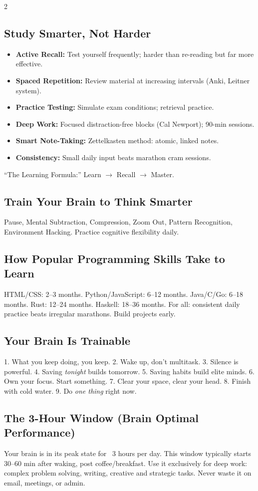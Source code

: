 \documentclass[10pt,a4paper]{article}
\begin{document}
\begin{multicols}{2}
\subsection{Study Smarter, Not Harder}
\begin{itemize}
\item \textbf{Active Recall:} Test yourself frequently; harder than re-reading but far more effective.
\item \textbf{Spaced Repetition:} Review material at increasing intervals (Anki, Leitner system).
\item \textbf{Practice Testing:} Simulate exam conditions; retrieval practice.
\item \textbf{Deep Work:} Focused distraction-free blocks (Cal Newport); 90-min sessions.
\item \textbf{Smart Note-Taking:} Zettelkasten method: atomic, linked notes.
\item \textbf{Consistency:} Small daily input beats marathon cram sessions.
\end{itemize}
``The Learning Formula:'' Learn $\to$ Recall $\to$ Master.

\subsection{Train Your Brain to Think Smarter}
Pause, Mental Subtraction, Compression, Zoom Out, Pattern Recognition, Environment Hacking. Practice cognitive flexibility daily.

\subsection{How Popular Programming Skills Take to Learn}
HTML/CSS: 2--3 months. Python/JavaScript: 6--12 months. Java/C/Go: 6--18 months. Rust: 12--24 months. Haskell: 18--36 months. For all: consistent daily practice beats irregular marathons. Build projects early.

\subsection{Your Brain Is Trainable}
1. What you keep doing, you keep.
2. Wake up, don't multitask.
3. Silence is powerful.
4. Saving \emph{tonight} builds tomorrow.
5. Saving habits build elite minds.
6. Own your focus. Start something.
7. Clear your space, clear your head.
8. Finish with cold water.
9. Do \emph{one thing} right now.

\subsection{The 3-Hour Window (Brain Optimal Performance)}
Your brain is in its peak state for ~3 hours per day. This window typically starts 30--60 min after waking, post coffee/breakfast. Use it exclusively for deep work: complex problem solving, writing, creative and strategic tasks. Never waste it on email, meetings, or admin.


\end{multicols}
\end{document}
